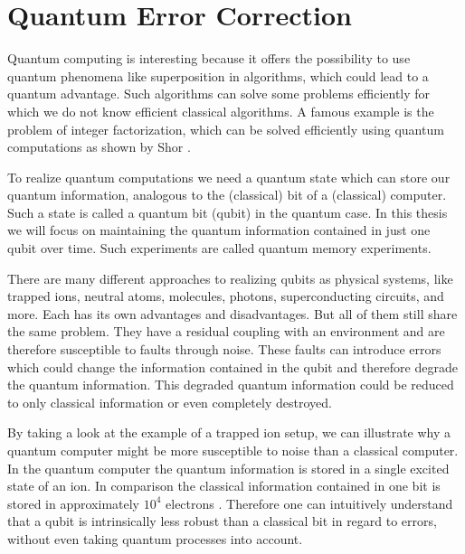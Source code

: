 \chapter{Quantum Error Correction}\label{chapter:qec}


Quantum computing is interesting because it offers the possibility to use quantum phenomena like superposition in algorithms, which could lead to a quantum advantage.
Such algorithms can solve some problems efficiently for which we do not know efficient classical algorithms.
A famous example is the problem of integer factorization, which can be solved efficiently using quantum computations as shown by Shor \cite{shor_factoring}. 

To realize quantum computations we need a quantum state which can store our quantum information, analogous to the (classical) bit of a (classical) computer.
Such a state is called a quantum bit (qubit) in the quantum case.
In this thesis we will focus on maintaining the quantum information contained in just one qubit over time. 
Such experiments are called quantum memory experiments. 

There are many different approaches to realizing qubits as physical systems, 
like trapped ions,  %
neutral atoms,       %
molecules,          %
photons,            %
superconducting circuits,%
and more. 
Each has its own advantages and disadvantages. 
But all of them still share the same problem. 
They have a residual coupling with an environment and are therefore susceptible to faults through noise. 
These faults can introduce errors which could change the information contained in the qubit and therefore degrade the quantum information. 
This degraded quantum information could be reduced to only classical information or even completely destroyed. 

By taking a look at the example of a trapped ion setup, we can illustrate why a quantum computer might be more susceptible to noise than a classical computer.
In the quantum computer the quantum information is stored in a single excited state of an ion.
In comparison the classical information contained in one bit is stored in approximately $10^4$ electrons \cite{classical_bits_electrons}.
Therefore one can intuitively understand that a qubit is intrinsically less robust than a classical bit in regard to errors, without even taking quantum processes into account.

